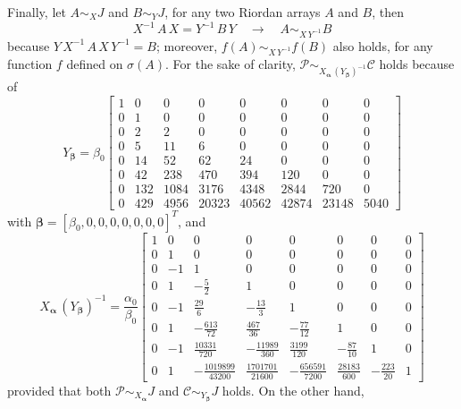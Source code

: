 Finally, let $A \sim_{X} J$ and $B \sim_{Y} J$, for any two Riordan arrays $A$ and $B$, then
\begin{displaymath}
    X^{-1}\,A\,X = Y^{-1}\,B\,Y \quad\rightarrow\quad A \sim_{X\,Y^{-1}} B
\end{displaymath}
because $Y\,X^{-1}\,A\,X\,Y^{-1} = B$; moreover, $f(A) \sim_{X\,Y^{-1}} f(B)$
also holds, for any function $f$ defined on $\sigma(A)$. For the sake of
clarity, $\mathcal{P} \sim_{X_{\boldsymbol{\alpha}}\,\left(Y_{\boldsymbol{\beta}}\right)^{-1}}\mathcal{C}$ holds
because of
\begin{displaymath}
Y_{\boldsymbol{\beta}} = \beta_{0} \left[\begin{matrix}1 & 0 & 0 & 0 & 0 & 0 & 0 & 0\\0 & 1 & 0 & 0 & 0 & 0 & 0 & 0\\0 & 2 & 2 & 0 & 0 & 0 & 0 & 0\\0 & 5 & 11 & 6 & 0 & 0 & 0 & 0\\0 & 14 & 52 & 62 & 24 & 0 & 0 & 0\\0 & 42 & 238 & 470 & 394 & 120 & 0 & 0\\0 & 132 & 1084 & 3176 & 4348 & 2844 & 720 & 0\\0 & 429 & 4956 & 20323 & 40562 & 42874 & 23148 & 5040\end{matrix}\right]
\end{displaymath}
with $\boldsymbol{\beta} = \left[ \beta_{0}, 0,0,0,0,0,0,0 \right]^{T}$, and
\begin{displaymath}
{X_{\boldsymbol{\alpha}}\,\left(Y_{\boldsymbol{\beta}}\right)^{-1}} = \frac{\alpha_{0}}{\beta_{0}} \left[\begin{matrix}1 & 0 & 0 & 0 & 0 & 0 & 0 & 0\\0 & 1 & 0 & 0 & 0 & 0 & 0 & 0\\0 & -1 & 1 & 0 & 0 & 0 & 0 & 0\\0 & 1 & - \frac{5}{2} & 1 & 0 & 0 & 0 & 0\\0 & -1 & \frac{29}{6} & - \frac{13}{3} & 1 & 0 & 0 & 0\\0 & 1 & - \frac{613}{72} & \frac{467}{36} & - \frac{77}{12} & 1 & 0 & 0\\0 & -1 & \frac{10331}{720} & - \frac{11989}{360} & \frac{3199}{120} & - \frac{87}{10} & 1 & 0\\0 & 1 & - \frac{1019899}{43200} & \frac{1701701}{21600} & - \frac{656591}{7200} & \frac{28183}{600} & - \frac{223}{20} & 1\end{matrix}\right]
\end{displaymath}
provided that both $\mathcal{P}\sim_{X_{\boldsymbol{\alpha}}}J$ and $\mathcal{C}\sim_{Y_{\boldsymbol{\beta}}}J$ holds. On the other hand,
